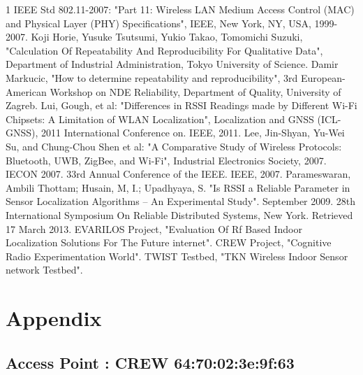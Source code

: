 \documentclass[11pt,a4paper,headinclude,footinclude,chapterprefix=on]{scrreprt}
\begin{document}
\begin{thebibliography}
	{1}  IEEE Std 802.11-2007: "Part 11: Wireless LAN Medium Access Control (MAC) and Physical Layer (PHY) Specifications", IEEE, New York, NY, USA, 1999-2007.  Koji Horie, Yusuke Tsutsumi, Yukio Takao, Tomomichi Suzuki, "Calculation Of Repeatability And Reproducibility For Qualitative Data", Department of Industrial Administration, Tokyo University of Science.  Damir Markucic, "How to determine repeatability and reproducibility", 3rd European-American Workshop on NDE Reliability, Department of Quality, University of Zagreb.  Lui, Gough, et al: "Differences in RSSI Readings made by Different Wi-Fi Chipsets: A Limitation of WLAN Localization", Localization and GNSS (ICL-GNSS), 2011 International Conference on. IEEE, 2011.  Lee, Jin-Shyan, Yu-Wei Su, and Chung-Chou Shen et al: "A Comparative Study of Wireless Protocols: Bluetooth, UWB, ZigBee, and Wi-Fi", Industrial Electronics Society, 2007. IECON 2007. 33rd Annual Conference of the IEEE. IEEE, 2007.  Parameswaran, Ambili Thottam; Husain, M, I.; Upadhyaya, S. "Is RSSI a Reliable Parameter in Sensor Localization Algorithms – An Experimental Study". September 2009. 28th International Symposium On Reliable Distributed Systems, New York. Retrieved 17 March 2013.  EVARILOS Project, "Evaluation Of Rf Based Indoor Localization Solutions For The Future internet".  CREW Project, "Cognitive Radio Experimentation World".  TWIST Testbed, "TKN Wireless Indoor Sensor network Testbed". 
\end{thebibliography}

\chapter{Appendix} 
\section{Access Point : CREW 64:70:02:3e:9f:63} 
\end{document}
